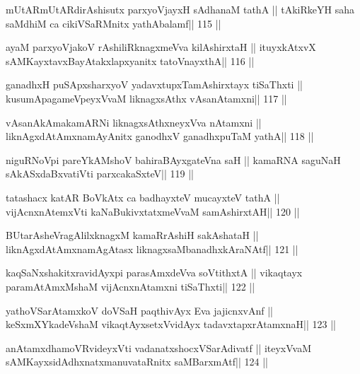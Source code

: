 \begin{shl}
mUtARmUtARdirAshisutx parxyoVjayxH sAdhanaM tathA ||
tAkiRkeYH saha saMdhiM ca cikiVSaRMnitx yathAbalamf\hfill || 115 ||
\end{shl}

\begin{shl}
ayaM parxyoVjakoV rAshiliRknagxmeVva kilA\s\s shirxtaH ||
ituyxkAtxvX sAMKayxtavxBayAtakxlapxyanitx tatoV\s nayxthA\hfill || 116 ||
\end{shl}

\begin{shl}
ganadhxH puSApxsharxyoV yadavxtupxTamAshirxtayx tiSaThxti ||
kusumApagameV\s peyxVvaM liknagxsAthx vAsanA\s\s tamxni\hfill || 117 ||
\end{shl}

\begin{shl}
vAsanAkAmakamARNi liknagxsAthxneyxVva nA\s\s tamxni ||
liknAgxdAtAmxnamAyAnitx ganodhxV ganadhxpuTaM yathA\hfill || 118 ||
\end{shl}

\begin{shl}
niguRNoV\s pi pareYkAMshoV bahiraBAyxgateVna saH ||
kamaRNA saguNaH sAkASxdaBxvatiVti parxcakaSxteV\hfill || 119 ||
\end{shl}

\begin{shl}
tatashacx katAR BoVkAtx ca badhayxteV mucayxteV tathA ||
vijAcnxnAtemxVti kaNaBukivxtatxmeVvaM samAshirxtAH\hfill || 120 ||
\end{shl}

\begin{shl}
BUtarAsheVragAlilxknagxM kamaRrAshiH sakAshataH ||
liknAgxdAtAmxnamAgAtasx liknagxsaMbanadhxkAraNAtf\hfill || 121 ||
\end{shl}

\begin{shl}
kaqSaNxshakitxravidAyx\s pi parasAmxdeVva soVtithxtA ||
vikaqtayx paramAtAmxMshaM vijAcnxnAtamxni tiSaThxti\hfill || 122 ||
\end{shl}

\begin{shl}
yathoVSarAtamxkoV doVSaH paqthivAyx Eva jajicnxvAnf ||
keSxmXYkadeVshaM vikaqtAyx\s\s setxV\s vidAyx tadavxtapxrAtamxnaH\hfill || 123 ||
\end{shl}

\begin{shl}
anAtamxdhamoVR\s videyxVti vadanatxshocxVSarAdivatf ||
iteyxVvaM sAMKayxsidAdhxnatxmanuvataRnitx saMBarxmAtf\hfill || 124 ||
\end{shl}

